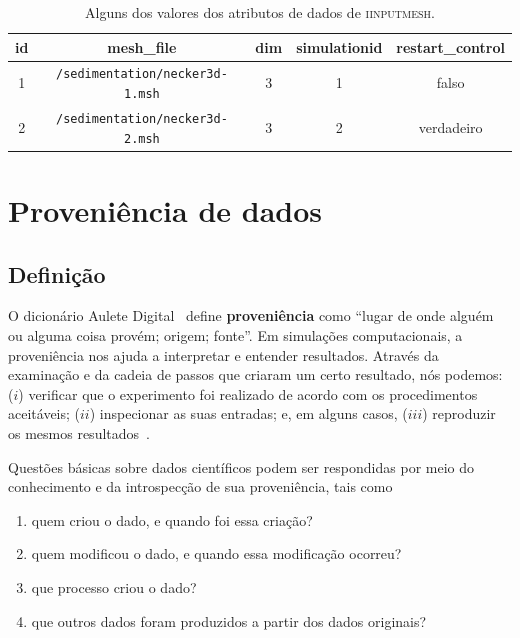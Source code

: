 \begin{table}[htb]
    \centering
    \begin{tabular}{c|c|c|c|c}
        \textbf{id} & \textbf{mesh{\_}file} & \textbf{dim} & \textbf{simulationid} & \textbf{restart{\_}control} \\
        \hline
        1 & \texttt{/sedimentation/necker3d-1.msh} & 3 & 1 & \textrm{falso} \\
        2 & \texttt{/sedimentation/necker3d-2.msh} & 3 & 2 & \textrm{verdadeiro} \\
    \end{tabular}
    \caption[Valores dos atributos de dados de \textsc{iinputmesh}]{Alguns dos valores dos atributos de dados de \textsc{iinputmesh}.}%
    \label{tab:iinputmesh-values}
\end{table}

\section{Proveniência de dados}

\subsection{Definição}

O dicionário Aulete Digital~\cite{aulete2014dicionario} define \textbf{proveniência} como
``lugar de onde alguém ou alguma coisa provém; origem; fonte''. Em simulações computacionais, a proveniência nos ajuda a interpretar e entender resultados. Através da examinação e da cadeia de passos que criaram um certo resultado, nós podemos: (\(i\)) verificar que o experimento foi realizado de acordo com os procedimentos aceitáveis; (\(ii\)) inspecionar as suas entradas; e, em alguns casos, (\(iii\)) reproduzir os mesmos resultados~\cite{freire2008provenance}.

Questões básicas sobre dados científicos podem ser respondidas por meio do conhecimento e da introspecção de sua proveniência, tais como

\begin{enumerate}
    \item quem criou o dado, e quando foi essa criação?
    \item quem modificou o dado, e quando essa modificação ocorreu?
    \item que processo criou o dado?
    \item que outros dados foram produzidos a partir dos dados originais?
\end{enumerate}

